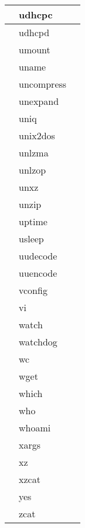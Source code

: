 \begin{longtable}{llp{50mm}}
 & udhcpc &  \\ \hline
 & udhcpd &  \\ \hline
 & umount &  \\ \hline
 & uname &  \\ \hline
 & uncompress &  \\ \hline
 & unexpand &  \\ \hline
 & uniq &  \\ \hline
 & unix2dos &  \\ \hline
 & unlzma &  \\ \hline
 & unlzop &  \\ \hline
 & unxz &  \\ \hline
 & unzip &  \\ \hline
 & uptime &  \\ \hline
 & usleep &  \\ \hline
 & uudecode &  \\ \hline
 & uuencode &  \\ \hline
 & vconfig &  \\ \hline
 & vi &  \\ \hline
 & watch &  \\ \hline
 & watchdog &  \\ \hline
 & wc &  \\ \hline
 & wget &  \\ \hline
 & which &  \\ \hline
 & who &  \\ \hline
 & whoami &  \\ \hline
 & xargs &  \\ \hline
 & xz &  \\ \hline
 & xzcat &  \\ \hline
 & yes &  \\ \hline
 & zcat &  \\ \hline

\end{longtable}